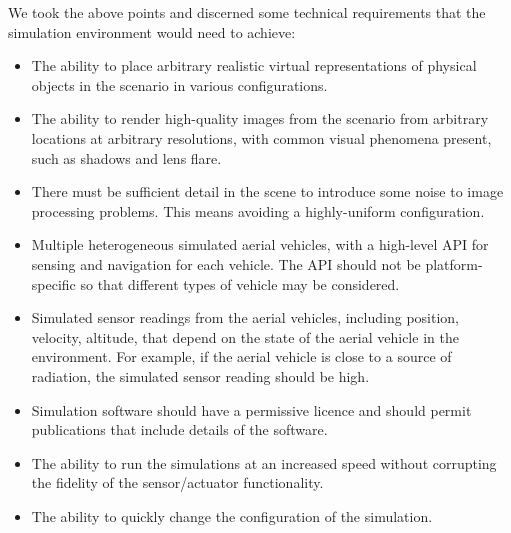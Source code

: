 We took the above points and discerned some technical requirements that the simulation environment would need to achieve:
\begin{itemize}
    \item The ability to place arbitrary realistic virtual representations of physical objects in the scenario in various configurations.
    \item The ability to render high-quality images from the scenario from arbitrary locations at arbitrary resolutions, with common visual phenomena present, such as shadows and lens flare.
    \item There must be sufficient detail in the scene to introduce some noise to image processing problems. This means avoiding a highly-uniform configuration.
    \item Multiple heterogeneous simulated aerial vehicles, with a high-level API for sensing and navigation for each vehicle. The API should not be platform-specific so that different types of vehicle may be considered.
    \item Simulated sensor readings from the aerial vehicles, including position, velocity, altitude, that depend on the state of the aerial vehicle in the environment. For example, if the aerial vehicle is close to a source of radiation, the simulated sensor reading should be high.
    \item Simulation software should have a permissive licence and should permit publications that include details of the software.
    \item The ability to run the simulations at an increased speed without corrupting the fidelity of the sensor/actuator functionality.
    \item The ability to quickly change the configuration of the simulation.
\end{itemize}


